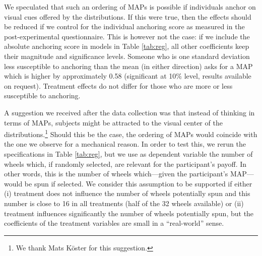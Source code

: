 We speculated that such an ordering of MAPs is possible if individuals anchor on visual cues offered by the distributions.
If this were true, then the effects should be reduced if we control for the individual anchoring score \citep{Cheek2017} as measured in the post-experimental questionnaire.
This is however not the case: if we include the absolute anchoring score in models in Table \ref{tab:reg}, all other coefficients keep their magnitude and significance levels.
Someone who is one standard deviation less susceptible to anchoring than the mean (in either direction) asks for a MAP which is higher by approximately 0.58 (significant at 10\% level, results available on request).
Treatment effects do not differ for those who are more or less susceptible to anchoring.

A suggestion we received after the data collection was that instead of thinking in terms of MAPs, subjects might be attracted to the visual center of the distributions.\footnote{
We thank Mats K\"{o}ster for this suggestion.
}
Should this be the case, the ordering of MAPs would coincide with the one we observe for a mechanical reason.
In order to test this, we rerun the specifications in Table \ref{tab:reg}, but we use as dependent variable the number of wheels which, if randomly selected, are relevant for the participant's payoff.
In other words, this is the number of wheels which---given the participant's MAP---would be spun if selected.
We consider this assumption to be supported if either (i) treatment does not influence the number of wheels potentially spun and this number is close to 16 in all treatments (half of the 32 wheels available) or (ii) treatment  influences significantly the number of wheels potentially spun, but the coefficients of the treatment variables are small in a ``real-world'' sense.

